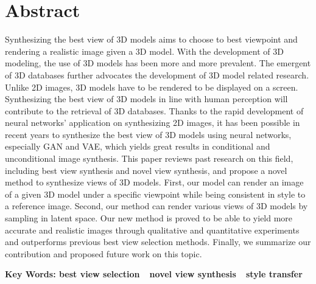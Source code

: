 \documentclass[UTF8,openany,AutoFakeBold,AutoFakeSlant,cs4size]{ctexbook}
\begin{document}
\fancyhf{}
\fancyfoot[CO,CE]{~\thepage~}
\renewcommand{\headrulewidth}{0.7pt}
\renewcommand{\footrulewidth}{0pt}
\clearpage






\small
\linespread{1.5}\selectfont
\chapter*{\bfseries Abstract}

Synthesizing the best view of 3D models aims to choose to best viewpoint and rendering a realistic image given a 3D model. With the development of 3D modeling, the use of 3D models has been more and more prevalent. The emergent of 3D databases further advocates the development of 3D model related research. Unlike 2D images, 3D models have to be rendered to be displayed on a screen. Synthesizing the best view of 3D models in line with human perception will contribute to the retrieval of 3D databases. Thanks to the rapid development of neural networks' application on synthesizing 2D images, it has been possible in recent years to synthesize the best view of 3D models using neural networks, especially GAN and VAE, which yields great results in conditional and unconditional image synthesis. This paper reviews past research on this field, including best view synthesis and novel view synthesis, and propose a novel method to synthesize views of 3D models. First, our model can render an image of a given 3D model under a specific viewpoint while being consistent in style to a reference image. Second, our method can render various views of 3D models by sampling in latent space. Our new method is proved to be able to yield more accurate and realistic images through qualitative and quantitative experiments and outperforms previous best view selection methods. Finally, we summarize our contribution and proposed future work on this topic.

\bigskip
\noindent
{\bfseries Key Words: best view selection\ \ novel view synthesis\ \ style transfer}



{
	\fancyhf{}
	\fancyfoot[CO,CE]{~\thepage~}
	\renewcommand{\headrulewidth}{0.7pt}
	\renewcommand{\footrulewidth}{0pt}
}
\fancyhf{}
\fancyfoot[CO,CE]{~\thepage~}
\renewcommand{\headrulewidth}{0.7pt}
\renewcommand{\footrulewidth}{0pt}
\clearpage
\end{document}
